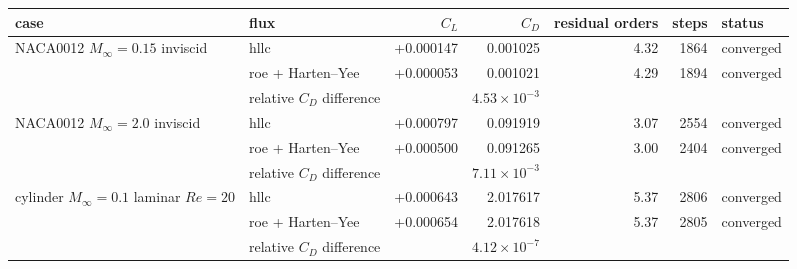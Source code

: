 \footnotesize
\begin{tabular}{llrrrrl}
\toprule
case & flux & $C_L$ & $C_D$ & residual orders & steps & status\\
\midrule
NACA0012 $M_\infty=0.15$ inviscid & hllc & +0.000147 & 0.001025 & 4.32 & 1864 & converged\\
 & roe + Harten--Yee & +0.000053 & 0.001021 & 4.29 & 1894 & converged\\
 & relative $C_D$ difference & & $4.53\times 10^{-3}$ & & & \\
\midrule
NACA0012 $M_\infty=2.0$ inviscid & hllc & +0.000797 & 0.091919 & 3.07 & 2554 & converged\\
 & roe + Harten--Yee & +0.000500 & 0.091265 & 3.00 & 2404 & converged\\
 & relative $C_D$ difference & & $7.11\times 10^{-3}$ & & & \\
\midrule
cylinder $M_\infty=0.1$ laminar $Re=20$ & hllc & +0.000643 & 2.017617 & 5.37 & 2806 & converged\\
 & roe + Harten--Yee & +0.000654 & 2.017618 & 5.37 & 2805 & converged\\
 & relative $C_D$ difference & & $4.12\times 10^{-7}$ & & & \\
\bottomrule
\end{tabular}
